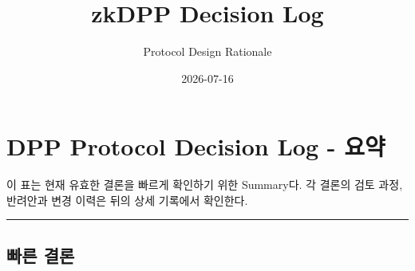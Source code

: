 \documentclass[11pt]{extarticle}
\title{zkDPP Decision Log}
\author{Protocol Design Rationale}
\date{2026-07-16}
\begin{document}
\maketitle
\tableofcontents
\newpage

\section{DPP Protocol Decision Log -
요약}\label{dpp-protocol-decision-log---uxc694uxc57d}

이 표는 현재 유효한 결론을 빠르게 확인하기 위한 Summary다. 각 결론의 검토 과정,
반려안과 변경 이력은 뒤의 상세 기록에서 확인한다.

\begin{center}\rule{0.5\linewidth}{0.5pt}\end{center}

\subsection{빠른 결론}\label{uxbe60uxb978-uxacb0uxb860}
\end{document}
